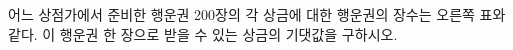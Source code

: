 \noindent\begin{minipage}[t]{0.58\linewidth}\vspace{0pt}\raggedright 어느 상점가에서 준비한 행운권 200장의 각 상금에 대한 행운권의 장수는 오른쪽 표와 같다. 이 행운권 한 장으로 받을 수 있는 상금의 기댓값을 구하시오.\end{minipage}\hfill\begin{minipage}[t]{0.4\linewidth}\vspace{0pt}\centering \resizebox{\ifdim\width>\linewidth\linewidth\else\width\fi}{!}{}\end{minipage}\par
